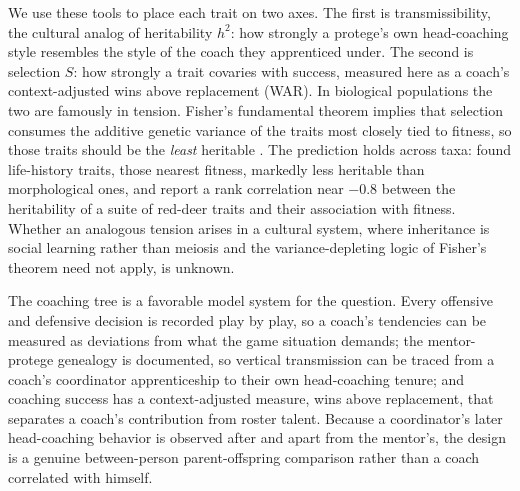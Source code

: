 \documentclass[11pt]{article}
\begin{document}
We use these tools to place each trait on two axes. The first is transmissibility,
the cultural analog of heritability $h^{2}$: how strongly a protege's own
head-coaching style resembles the style of the coach they apprenticed under. The
second is selection $S$: how strongly a trait covaries with success, measured here
as a coach's context-adjusted wins above replacement (WAR). In biological
populations the two are famously in tension. Fisher's fundamental theorem implies
that selection consumes the additive genetic variance of the traits most closely
tied to fitness, so those traits should be the \emph{least} heritable
\citep{fisher1930}. The prediction holds across taxa: \citet{mousseauroff1987}
found life-history traits, those nearest fitness, markedly less heritable than
morphological ones, and \citet{kruuk2000} report a rank correlation near $-0.8$
between the heritability of a suite of red-deer traits and their association with
fitness. Whether an analogous tension arises in a cultural system, where
inheritance is social learning rather than meiosis and the variance-depleting logic
of Fisher's theorem need not apply, is unknown.

The coaching tree is a favorable model system for the question. Every offensive and
defensive decision is recorded play by play, so a coach's tendencies can be measured
as deviations from what the game situation demands; the mentor-protege genealogy is
documented, so vertical transmission can be traced from a coach's coordinator
apprenticeship to their own head-coaching tenure; and coaching success has a
context-adjusted measure, wins above replacement, that separates a coach's
contribution from roster talent. Because a coordinator's later head-coaching behavior
is observed after and apart from the mentor's, the design is a genuine
between-person parent-offspring comparison rather than a coach correlated with
himself.
\end{document}

